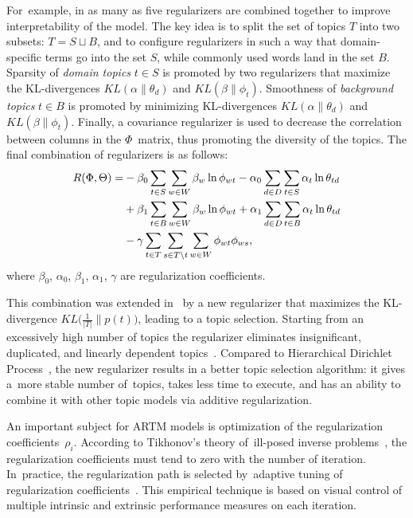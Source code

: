\documentclass{sig-alternate-2013}
\begin{document}
For~example,
in \cite{voron14mlj} as many as five regularizers are combined together to improve interpretability of the model.
The key idea is to split the set of topics $T$ into two subsets: ${T = S \sqcup B}$,
and to configure regularizers in such a way that
domain-specific terms go into the set $S$,
while commonly used words land in the set $B$.
Sparsity of \emph{domain topics} $t \in S$ is promoted by two regularizers that maximize the KL-divergences
$KL(\alpha\|\theta_d)$ and
$KL(\beta\|\phi_t)$.
Smoothness of \emph{background topics} $t \in B$ is promoted by minimizing KL-divergences
$KL(\alpha\|\theta_d)$ and
$KL(\beta\|\phi_t)$.
Finally, a covariance regularizer is used to
decrease the correlation between columns in the $\Phi$~matrix, thus promoting the diversity of the topics.
The final combination of regularizers is as follows:
\begin{align*}
    R(\Phi,\Theta)
    =&
    - \beta_0 \sum_{t\in S} \sum_{w\in W} \beta_w \ln \phi_{wt}
    - \alpha_0 \sum_{d\in D} \sum_{t\in S} \alpha_t \ln \theta_{td}
    \notag
\\  {}&
    + \beta_1 \sum_{t\in B} \sum_{w\in W} \beta_w \ln \phi_{wt}
    + \alpha_1 \sum_{d\in D} \sum_{t\in B} \alpha_t \ln \theta_{td}
\\  {}&
    - \gamma
        \sum_{t\in T}
        \sum_{s\in T\backslash t}
        \sum_{w\in W} \phi_{wt}\phi_{ws},
\end{align*}
where $\beta_0$, $\alpha_0$, $\beta_1$, $\alpha_1$, $\gamma$
are regularization coefficients.

This combination was extended in~\cite{voron14aist} by a new regularizer that maximizes the KL-divergence
$KL\bigl( \frac1{|T|}\|p(t) \bigr)$,
leading to a topic selection.
Starting from an excessively high number of topics
the regularizer eliminates insignificant, duplicated, and linearly dependent topics~\cite{voron15slds}.
Compared to Hierarchical Dirichlet Process~\cite{teh06hierarchical},
the new regularizer results in a better topic selection algorithm:
it gives a~more stable number of~topics, takes less time to execute,
and has an ability to combine it with other topic models via additive regularization.

An important subject for ARTM models is optimization of the regularization coefficients~$\rho_i$.
According to Tikhonov's theory of~ill-posed inverse problems~\cite{tihonov77methods-eng},
the regularization coefficients must tend to zero with the number of iteration.
In~practice,
the regularization path is selected
by~adaptive tuning of regularization coefficients~\cite{voron14mlj,voron14aist,voron15slds}.
This empirical technique is based on visual control of
multiple intrinsic and extrinsic performance measures
on each iteration.
\end{document}
